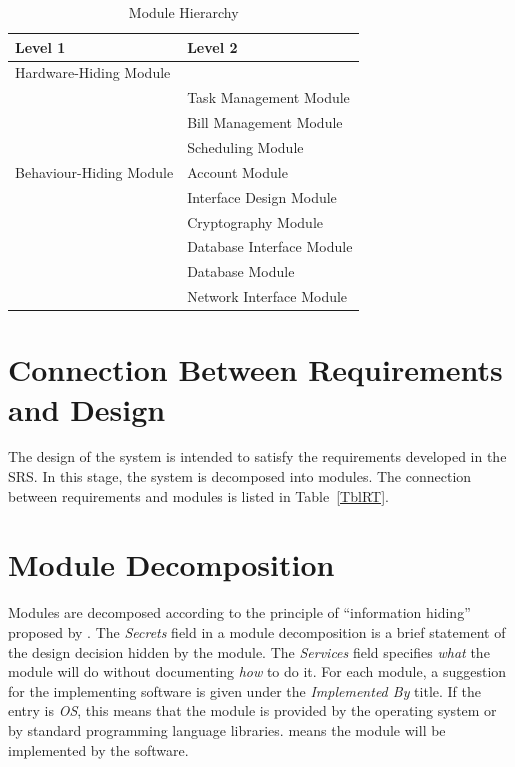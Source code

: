\documentclass[12pt, titlepage]{article}
\begin{document}
\begin{table}[h!]
\centering
\begin{tabular}{p{} p{}}
\toprule
\textbf{Level 1} & \textbf{Level 2}\\
\midrule

{Hardware-Hiding Module} & ~ \\
\midrule

\multirow{7}{0.3\textwidth}{Behaviour-Hiding Module} 
& Task Management Module\\
& Bill Management Module\\
& Scheduling Module\\
& Account Module\\
& Interface Design Module\\
\midrule

\multirow{3}{0.3\textwidth}{Software Decision Module}
& Cryptography Module\\
& Database Interface Module\\
& Database Module\\
& Network Interface Module\\
\bottomrule

\end{tabular}
\caption{Module Hierarchy}
\label{TblMH}
\end{table}

\section{Connection Between Requirements and Design} \label{SecConnection}

The design of the system is intended to satisfy the requirements developed in
the SRS. In this stage, the system is decomposed into modules. The connection
between requirements and modules is listed in Table~\ref{TblRT}.

\section{Module Decomposition} \label{SecMD}

Modules are decomposed according to the principle of ``information hiding''
proposed by \citet{ParnasEtAl1984}. The \emph{Secrets} field in a module
decomposition is a brief statement of the design decision hidden by the
module. The \emph{Services} field specifies \emph{what} the module will do
without documenting \emph{how} to do it. For each module, a suggestion for the
implementing software is given under the \emph{Implemented By} title. If the
entry is \emph{OS}, this means that the module is provided by the operating
system or by standard programming language libraries.  \emph{\progname{}} means the
module will be implemented by the \progname{} software.
\end{document}
